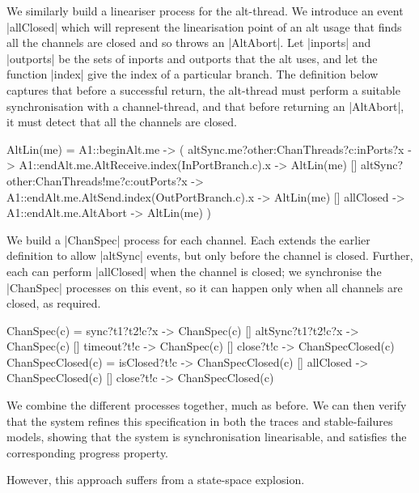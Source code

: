 We similarly build a lineariser process for the alt-thread.  We introduce an
event |allClosed| which will represent the linearisation point of an alt usage
that finds all the channels are closed and so throws an |AltAbort|.  
%
Let |inports| and |outports| be the sets of inports and outports that the alt
uses, and let the function |index| give the index of a particular branch.  The
definition below captures that before a successful return, the alt-thread must
perform a suitable synchronisation with a channel-thread, and that before
returning an |AltAbort|, it must detect that all the channels are closed. 
%
\begin{cspm}
AltLin(me) = 
  A1::beginAlt.me -> (
    altSync.me?other:ChanThreads?c:inPorts?x -> 
      A1::endAlt.me.AltReceive.index(InPortBranch.c).x -> AltLin(me)
    [] altSync?other:ChanThreads!me?c:outPorts?x ->
        A1::endAlt.me.AltSend.index(OutPortBranch.c).x -> AltLin(me)
    [] allClosed -> A1::endAlt.me.AltAbort -> AltLin(me)
  )
\end{cspm}

We build a |ChanSpec| process for each channel.  Each extends the earlier
definition to allow |altSync| events, but only before the channel is closed.
Further, each can perform |allClosed| when the channel is closed; we
synchronise the |ChanSpec| processes on this event, so it can happen only when
all channels are closed, as required. 
%
\begin{cspm}
ChanSpec(c) = 
  sync?t1?t2!c?x -> ChanSpec(c) [] altSync?t1?t2!c?x -> ChanSpec(c) 
  [] timeout?t!c -> ChanSpec(c)   [] close?t!c -> ChanSpecClosed(c)
ChanSpecClosed(c) =
  isClosed?t!c -> ChanSpecClosed(c) [] allClosed -> ChanSpecClosed(c)
  [] close?t!c -> ChanSpecClosed(c)
\end{cspm}

We combine the different processes together, much as before.  We can then
verify that the system refines this specification in both the traces and
stable-failures models, showing that the system is synchronisation
linearisable, and satisfies the corresponding progress property. 

However, this approach suffers from a state-space explosion.
